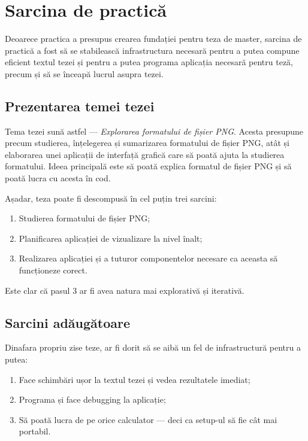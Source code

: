 \documentclass[a4paper,12pt]{report}
\begin{document}
\chapter{Sarcina de practică}

Deoarece practica a presupus crearea fundației pentru teza de master,
sarcina de practică a fost să se stabilească infrastructura necesară pentru a putea compune
eficient textul tezei și pentru a putea programa aplicația necesară pentru teză,
precum și să se înceapă lucrul asupra tezei.


\section{Prezentarea temei tezei}

Tema tezei sună astfel --- \textit{Explorarea formatului de fișier \ac{PNG}}.
Acesta presupune precum studierea, înțelegerea și sumarizarea formatului de fișier \ac{PNG},
atât și elaborarea unei aplicații de interfață grafică care să poată ajuta la studierea formatului.
Ideea principală este să poată explica formatul de fișier \ac{PNG} 
și să poată lucra cu acesta în cod.

Așadar, teza poate fi descompusă în cel puțin trei sarcini:
\begin{enumerate}
  \item Studierea formatului de fișier \ac{PNG};
  \item Planificarea aplicației de vizualizare la nivel înalt;
  \item Realizarea aplicației și a tuturor componentelor necesare ca aceasta să funcționeze corect.
\end{enumerate}
Este clar că pasul 3 ar fi avea natura mai explorativă și iterativă.


\section{Sarcini adăugătoare}

Dinafara propriu zise teze, ar fi dorit să se aibă un fel de infrastructură pentru a putea:
\begin{enumerate}
  \item Face schimbări ușor la textul tezei și vedea rezultatele imediat;
  \item Programa și face debugging la aplicație;
  \item Să poată lucra de pe orice calculator --- deci ca setup-ul să fie cât mai portabil.
\end{enumerate}
\end{document}
